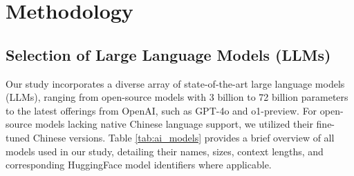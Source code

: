 \documentclass[conference]{IEEEtran}
\begin{document}
\section{Methodology}

\subsection{Selection of Large Language Models (LLMs)}

Our study incorporates a diverse array of state-of-the-art large language models (LLMs), ranging from open-source models with 3 billion to 72 billion parameters to the latest offerings from OpenAI, such as GPT-4o and o1-preview. For open-source models lacking native Chinese language support, we utilized their fine-tuned Chinese versions. Table \ref{tab:ai_models} provides a brief overview of all models used in our study, detailing their names, sizes, context lengths, and corresponding HuggingFace model identifiers where applicable.
\end{document}
